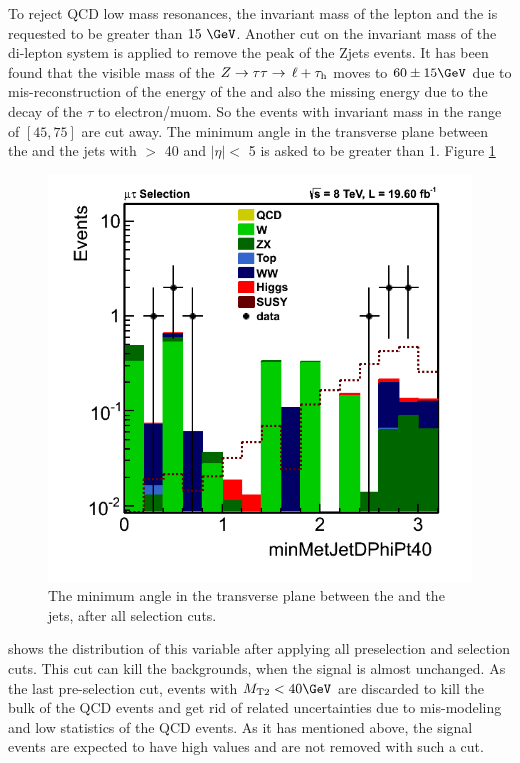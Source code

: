 To reject QCD low mass resonances, the invariant mass of the lepton and the \Tau is requested to be greater than $15\ \GeV$. Another cut on the invariant mass of the di-lepton system is applied to remove the peak of the Zjets events. It has been found that the visible mass of the $Z\to\tau\tau\to\,\ell +\tau_{\rm h}$ moves to $60 \pm 15 \GeV$ due to mis-reconstruction of the energy of the \Tau and also the missing energy due to the decay of the $\tau$ to electron/muom. So the events with invariant mass in the range of $[45,75]$ are cut away. The minimum angle in the transverse plane between the \MPT and the jets with \PT $>$ 40 \GeVc and $|\eta| <$ 5 is asked to be greater than 1. Figure \ref{fig:minDphi}
\begin{figure}[!Hhtb]
\centering
\includegraphics[angle=0,scale=0.35]{SelectionMuTau/minMetJetDPhi.png}
\caption{The minimum angle in the transverse plane between the \MPT and the jets, after all \muTau selection cuts.}
\label{fig:minDphi}
\end{figure}
shows the distribution of this variable after applying all preselection and selection cuts. This cut can kill the backgrounds, 
when the signal is almost unchanged.
As the last pre-selection cut, events with $\mttwo<40 \GeV$ are discarded to kill the bulk of the QCD events and get rid of related uncertainties due to mis-modeling and low statistics 
of the QCD events. As it has mentioned above, the signal events are expected to have high \mttwo values and are not removed with such a cut.

